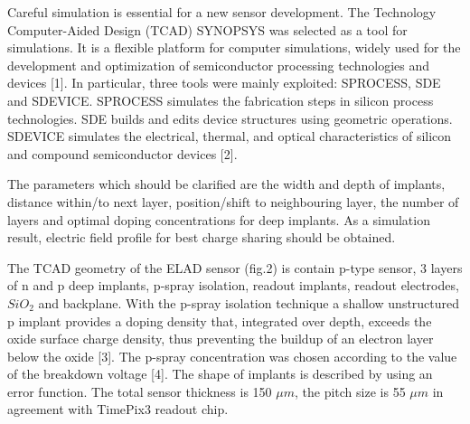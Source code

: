 
Careful simulation is essential for a new sensor development. 
The  Technology Computer-Aided Design (TCAD) SYNOPSYS was selected  as a tool for simulations. 
It is a flexible platform for computer simulations, widely used for the development and optimization of semiconductor processing technologies and devices [1]. 
In particular, three tools were mainly exploited: SPROCESS, SDE and SDEVICE. 
SPROCESS simulates the fabrication steps in silicon process technologies. 
SDE builds and edits device structures using geometric operations. 
SDEVICE simulates the electrical, thermal, and optical characteristics of silicon and compound semiconductor devices [2].

The parameters which should be clarified are the width and depth of implants, distance within/to next layer, position/shift to neighbouring layer,
 the number of layers and optimal doping concentrations for deep implants.
 As a simulation result, electric field profile for best charge sharing should be obtained. 

The TCAD geometry of the ELAD sensor (fig.2) is contain p-type sensor, 3 layers of n and p deep implants, p-spray isolation, readout implants, readout electrodes, $SiO_2$ and backplane. 
With the p-spray isolation technique a shallow unstructured p implant provides a doping density that, integrated over depth, exceeds the oxide surface charge density,
 thus preventing the buildup of an electron layer below the oxide [3]. 
The p-spray concentration was chosen according to the value of the breakdown voltage [4]. 
The shape of implants is described by using an error function. 
The total sensor thickness is 150 $\mu m$, the pitch size is 55 $\mu m$ in agreement with TimePix3 readout chip. 

